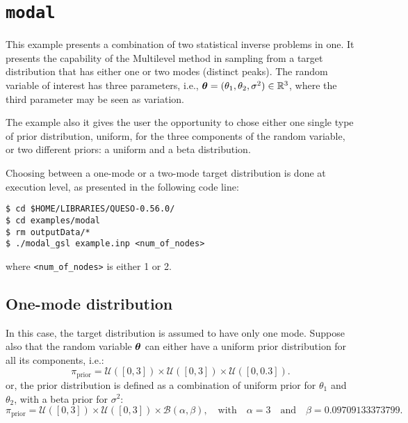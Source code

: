 \section{\texttt{modal}}\label{sec:example_modal}


This example presents a combination of two statistical inverse problems in one.
It presents the capability of the Multilevel method in sampling from a target distribution that has either one or two modes (distinct peaks). The random variable of interest has three parameters, i.e., $\mbox{\boldmath$ \theta $}=(\theta_1,\theta_2, \sigma^2) \in \mathbb{R}^3$, where the third parameter may be seen as variation.

The example also it gives the user the opportunity to chose either one single type of prior distribution, uniform, for the three components of the random variable, or two different priors: a uniform and a beta distribution.

Choosing between a one-mode or a two-mode target distribution is done at execution level, as presented in the following code line:

\begin{lstlisting}[label={},caption={}]
$ cd $HOME/LIBRARIES/QUESO-0.56.0/
$ cd examples/modal
$ rm outputData/*
$ ./modal_gsl example.inp <num_of_nodes>
\end{lstlisting}
where \verb+<num_of_nodes>+ is either 1 or 2.
%
%
%
%
%
%
%
%
\subsection{One-mode distribution}

In this case, the target distribution is assumed to have only one mode.
Suppose also that the random variable $\mbox{\boldmath$ \theta $}$  can either have a uniform prior distribution for all its components, i.e.:
$$
\pi_{\text{prior}}=\mathcal{U}([0,3]) \times \mathcal{U}([0,3]) \times \mathcal{U}([0,0.3]).
$$
or, the prior distribution is defined as a combination of uniform prior for $\theta_1$ and $\theta_2$, with a beta prior for $\sigma^2$:
$$
\pi_{\text{prior}}=\mathcal{U}([0,3]) \times \mathcal{U}([0,3]) \times \mathcal{B}(\alpha,\beta), \quad \text{with} \quad \alpha=3 \quad\text{and}\quad \beta=0.09709133373799.
$$

